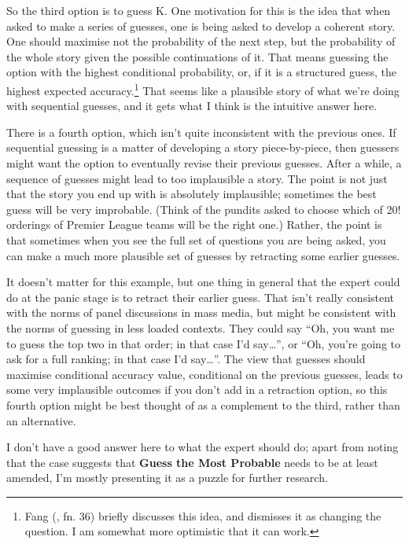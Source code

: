 \documentclass[
  11pt,
  letterpaper,
  DIV=11,
  numbers=noendperiod,
  twoside]{scrartcl}
\begin{document}
So the third option is to guess K. One motivation for this is the idea
that when asked to make a series of guesses, one is being asked to
develop a coherent story. One should maximise not the probability of the
next step, but the probability of the whole story given the possible
continuations of it. That means guessing the option with the highest
conditional probability, or, if it is a structured guess, the highest
expected accuracy.\footnote{Fang (, fn. 36)
  briefly discusses this idea, and dismisses it as changing the
  question. I am somewhat more optimistic that it can work.} That seems
like a plausible story of what we're doing with sequential guesses, and
it gets what I think is the intuitive answer here.

There is a fourth option, which isn't quite inconsistent with the
previous ones. If sequential guessing is a matter of developing a story
piece-by-piece, then guessers might want the option to eventually revise
their previous guesses. After a while, a sequence of guesses might lead
to too implausible a story. The point is not just that the story you end
up with is absolutely implausible; sometimes the best guess will be very
improbable. (Think of the pundits asked to choose which of 20! orderings
of Premier League teams will be the right one.) Rather, the point is
that sometimes when you see the full set of questions you are being
asked, you can make a much more plausible set of guesses by retracting
some earlier guesses.

It doesn't matter for this example, but one thing in general that the
expert could do at the panic stage is to retract their earlier guess.
That isn't really consistent with the norms of panel discussions in mass
media, but might be consistent with the norms of guessing in less loaded
contexts. They could say ``Oh, you want me to guess the top two in that
order; in that case I'd say\ldots{}'', or ``Oh, you're going to ask for
a full ranking; in that case I'd say\ldots{}''. The view that guesses
should maximise conditional accuracy value, conditional on the previous
guesses, leads to some very implausible outcomes if you don't add in a
retraction option, so this fourth option might be best thought of as a
complement to the third, rather than an alternative.

I don't have a good answer here to what the expert should do; apart from
noting that the case suggests that \textbf{Guess the Most Probable}
needs to be at least amended, I'm mostly presenting it as a puzzle for
further research.
\end{document}
